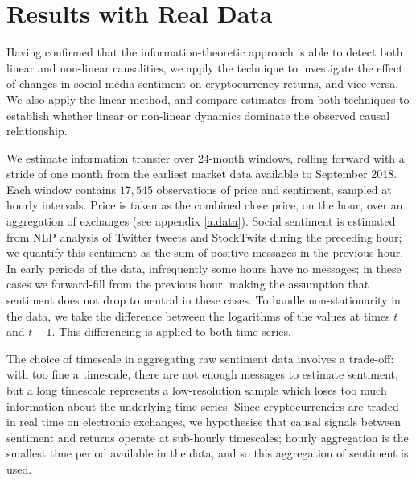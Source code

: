 \documentclass[]{rsos}%
\begin{document}


\section{Results with Real Data} \label{s.results}
  Having confirmed that the information-theoretic approach is able to detect both linear and non-linear causalities, we apply the technique to investigate the effect of changes in social media sentiment on cryptocurrency returns, and vice versa. We also apply the linear method, and compare estimates from both techniques to establish whether linear or non-linear dynamics dominate the observed causal relationship.

  We estimate information transfer over 24-month windows, rolling forward with a stride of one month from the earliest market data available to September 2018. Each window contains $17,545$ observations of price and sentiment, sampled at hourly intervals. Price is taken as the combined close price, on the hour, over an aggregation of exchanges (see appendix \ref{a.data}). Social sentiment is estimated from NLP analysis of Twitter tweets and StockTwits during the preceding hour; we quantify this sentiment as the sum of positive messages in the previous hour. In early periods of the data, infrequently some hours have no messages; in these cases we forward-fill from the previous hour, making the assumption that sentiment does not drop to neutral in these cases. To handle non-stationarity in the data, we take the difference between the logarithms of the values at times $t$ and $t-1$. This differencing is applied to both time series. 

  The choice of timescale in aggregating raw sentiment data involves a trade-off: with too fine a timescale, there are not enough messages to estimate sentiment, but a long timescale represents a low-resolution sample which loses too much information about the underlying time series. Since cryptocurrencies are traded in real time on electronic exchanges, we hypothesise that causal signals between sentiment and returns operate at sub-hourly timescales; hourly aggregation is the smallest time period available in the data, and so this aggregation of sentiment is used. 
\end{document}
